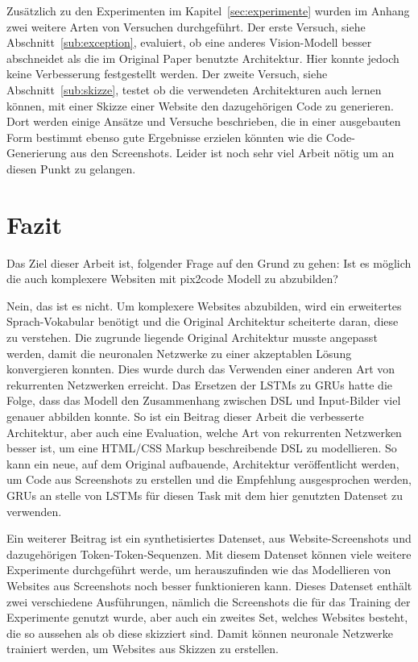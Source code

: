 \documentclass[pdftex,a4paper,halfparskip, article]{scrartcl}
\begin{document}
Zusätzlich zu den Experimenten im Kapitel~\ref{sec:experimente} wurden im Anhang zwei weitere Arten von Versuchen durchgeführt. Der erste Versuch, siehe Abschnitt~\ref{sub:exception}, evaluiert, ob eine anderes Vision-Modell besser abschneidet als die im Original Paper benutzte Architektur. Hier konnte jedoch keine Verbesserung festgestellt werden. 
Der zweite Versuch, siehe Abschnitt~\ref{sub:skizze}, testet ob die verwendeten Architekturen auch lernen können, mit einer Skizze einer Website den dazugehörigen Code zu generieren. Dort werden einige Ansätze und Versuche beschrieben, die in einer ausgebauten Form bestimmt ebenso gute Ergebnisse erzielen könnten wie die Code-Generierung aus den Screenshots. Leider ist noch sehr viel Arbeit nötig um an diesen Punkt zu gelangen.

\newpage
\section{Fazit}

Das Ziel dieser Arbeit ist, folgender Frage auf den Grund zu gehen: Ist es möglich die auch komplexere Websiten mit pix2code Modell zu abzubilden?  

Nein, das ist es nicht. Um komplexere Websites abzubilden, wird ein erweitertes Sprach-Vokabular benötigt und die Original Architektur scheiterte daran, diese zu verstehen.
Die zugrunde liegende Original Architektur musste angepasst werden, damit die neuronalen Netzwerke zu einer akzeptablen Lösung konvergieren konnten. Dies wurde durch das Verwenden einer anderen Art von rekurrenten Netzwerken erreicht. Das Ersetzen der LSTMs zu GRUs hatte die Folge, dass das Modell den Zusammenhang zwischen DSL und Input-Bilder viel genauer abbilden konnte. So ist ein Beitrag dieser Arbeit die verbesserte Architektur, aber auch eine Evaluation, welche Art von rekurrenten Netzwerken besser ist, um eine HTML/CSS Markup beschreibende DSL zu modellieren. So kann ein neue, auf dem Original aufbauende, Architektur veröffentlicht werden, um Code aus Screenshots zu erstellen und die Empfehlung ausgesprochen werden, GRUs an stelle von LSTMs für diesen Task mit dem hier genutzten Datenset zu verwenden.

Ein weiterer Beitrag ist ein synthetisiertes Datenset, aus Website-Screenshots und dazugehörigen Token-Token-Sequenzen. Mit diesem Datenset können viele weitere Experimente durchgeführt werde, um herauszufinden wie das Modellieren von Websites aus Screenshots noch besser funktionieren kann. Dieses Datenset enthält zwei verschiedene Ausführungen, nämlich die Screenshots die für das Training der Experimente genutzt wurde, aber auch ein zweites Set, welches Websites besteht, die so aussehen als ob diese skizziert sind. Damit können neuronale Netzwerke trainiert werden, um Websites aus Skizzen zu erstellen.
\end{document}

